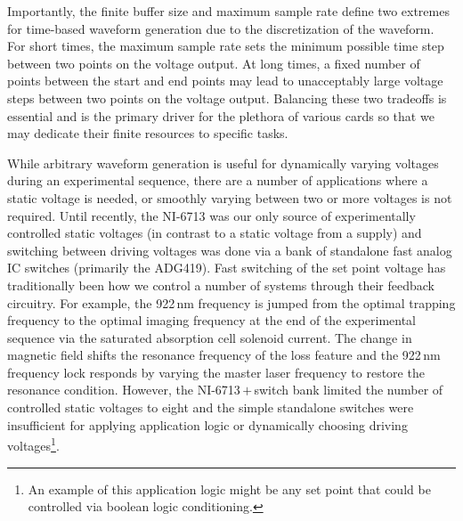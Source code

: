 Importantly, the finite buffer size and maximum sample rate define two extremes for time-based waveform generation due to the discretization of the waveform.
For short times, the maximum sample rate sets the minimum possible time step between two points on the voltage output.
At long times, a fixed number of points between the start and end points may lead to unacceptably large voltage steps between two points on the voltage output.
Balancing these two tradeoffs is essential and is the primary driver for the plethora of various cards so that we may dedicate their finite resources to specific tasks.

While arbitrary waveform generation is useful for dynamically varying voltages during an experimental sequence, there are a number of applications where a static voltage is needed, or smoothly varying between two or more voltages is not required.
Until recently, the NI-6713 was our only source of experimentally controlled static voltages (in contrast to a static voltage from a supply) and switching between driving voltages was done via a bank of standalone fast analog IC switches (primarily the ADG419).
Fast switching of the set point voltage has traditionally been how we control a number of systems through their feedback circuitry.
For example, the 922\,nm frequency is jumped from the optimal trapping frequency to the optimal imaging frequency at the end of the experimental sequence via the saturated absorption cell solenoid current.
The change in magnetic field shifts the resonance frequency of the loss feature and the 922\,nm frequency lock responds by varying the master laser frequency to restore the resonance condition.
However, the NI-6713\,$+$\,switch bank limited the number of controlled static voltages to eight and the simple standalone switches were insufficient for applying application logic or dynamically choosing driving voltages\footnote{An example of this application logic might be any set point that could be controlled via boolean logic conditioning.}.

